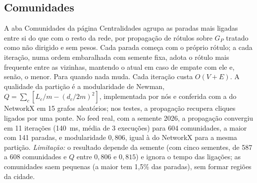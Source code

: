 \subsection{Comunidades}\label{sec:F-MET-OPC}

A aba Comunidades da página Centralidades agrupa as paradas mais ligadas entre si do que
com o resto da rede, por propagação de rótulos sobre $G_P$ tratado como não dirigido e sem
pesos. Cada parada começa com o próprio rótulo; a cada iteração, numa ordem embaralhada com
semente fixa, adota o rótulo mais frequente entre as vizinhas, mantendo o atual em caso de
empate com ele e, senão, o menor. Para quando nada muda. Cada iteração custa $O(V + E)$. A
qualidade da partição é a modularidade de Newman, $Q = \sum_c [L_c/m - (d_c/2m)^2]$,
implementada por nós e conferida com a do NetworkX em 15 grafos aleatórios; nos testes, a
propagação recupera cliques ligados por uma ponte. No feed real, com a semente 2026, a
propagação convergiu em 11 iterações (140~ms, média de 3 execuções) para 604 comunidades, a maior com
141 paradas, e modularidade $0{,}806$, igual à do NetworkX para a mesma partição.
\emph{Limitação:} o resultado depende da semente (com cinco sementes, de 587 a 608
comunidades e $Q$ entre $0{,}806$ e $0{,}815$) e ignora o tempo das ligações; as comunidades
saem pequenas (a maior tem 1,5\% das paradas), sem formar regiões da cidade.
